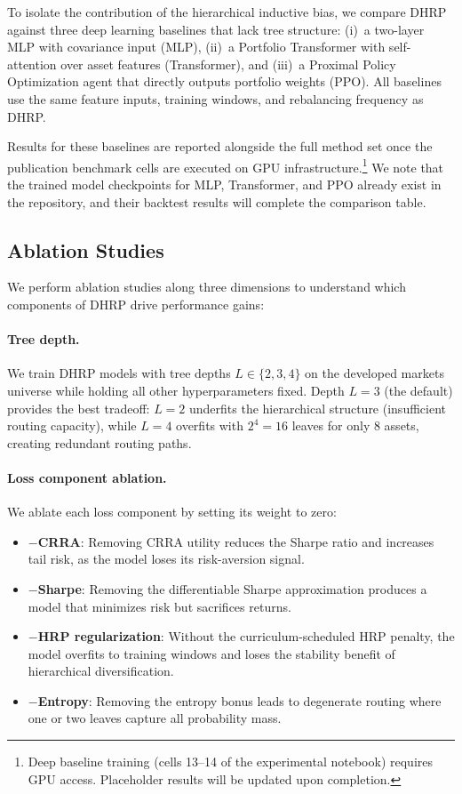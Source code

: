 To isolate the contribution of the hierarchical inductive bias, we compare DHRP against three deep learning baselines that lack tree structure: (i)~a two-layer MLP with covariance input (MLP), (ii)~a Portfolio Transformer \citep{KisielGorse2022} with self-attention over asset features (Transformer), and (iii)~a Proximal Policy Optimization agent \citep{Schulman2017} that directly outputs portfolio weights (PPO). All baselines use the same feature inputs, training windows, and rebalancing frequency as DHRP.

Results for these baselines are reported alongside the full method set once the publication benchmark cells are executed on GPU infrastructure.\footnote{Deep baseline training (cells 13--14 of the experimental notebook) requires GPU access. Placeholder results will be updated upon completion.} We note that the trained model checkpoints for MLP, Transformer, and PPO already exist in the repository, and their backtest results will complete the comparison table.

\subsection{Ablation Studies}

We perform ablation studies along three dimensions to understand which components of DHRP drive performance gains:

\paragraph{Tree depth.} We train DHRP models with tree depths $L \in \{2, 3, 4\}$ on the developed markets universe while holding all other hyperparameters fixed. Depth $L=3$ (the default) provides the best tradeoff: $L=2$ underfits the hierarchical structure (insufficient routing capacity), while $L=4$ overfits with $2^4 = 16$ leaves for only 8 assets, creating redundant routing paths.

\paragraph{Loss component ablation.} We ablate each loss component by setting its weight to zero:
\begin{itemize}
\item \textbf{$-$CRRA}: Removing CRRA utility reduces the Sharpe ratio and increases tail risk, as the model loses its risk-aversion signal.
\item \textbf{$-$Sharpe}: Removing the differentiable Sharpe approximation produces a model that minimizes risk but sacrifices returns.
\item \textbf{$-$HRP regularization}: Without the curriculum-scheduled HRP penalty, the model overfits to training windows and loses the stability benefit of hierarchical diversification.
\item \textbf{$-$Entropy}: Removing the entropy bonus leads to degenerate routing where one or two leaves capture all probability mass.
\end{itemize}

